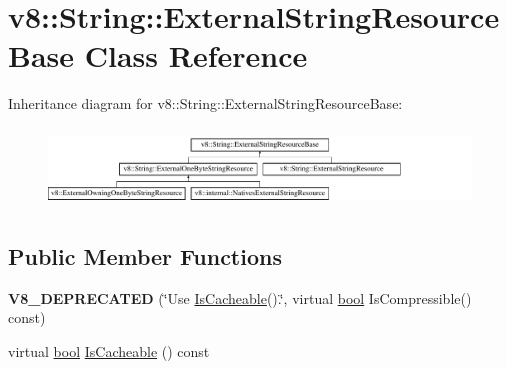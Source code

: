 \hypertarget{classv8_1_1String_1_1ExternalStringResourceBase}{}\section{v8\+:\+:String\+:\+:External\+String\+Resource\+Base Class Reference}
\label{classv8_1_1String_1_1ExternalStringResourceBase}
Inheritance diagram for v8\+:\+:String\+:\+:External\+String\+Resource\+Base\+:\begin{figure}[H]
\begin{center}
\leavevmode
\includegraphics[height=2.113208cm]{classv8_1_1String_1_1ExternalStringResourceBase}
\end{center}
\end{figure}
\subsection*{Public Member Functions}
\begin{DoxyCompactItemize}
\item 
\mbox{\label{classv8_1_1String_1_1ExternalStringResourceBase_a07d6b2291158845591c0458365582c31}} 
{\bfseries V8\+\_\+\+D\+E\+P\+R\+E\+C\+A\+T\+ED} (\char`\"{}Use \mbox{\hyperlink{classv8_1_1String_1_1ExternalStringResourceBase_a994c7580185c831abd45075d297dd07c}{Is\+Cacheable}}().\char`\"{}, virtual \mbox{\hyperlink{classbool}{bool}} Is\+Compressible() const)
\item 
virtual \mbox{\hyperlink{classbool}{bool}} \mbox{\hyperlink{classv8_1_1String_1_1ExternalStringResourceBase_a994c7580185c831abd45075d297dd07c}{Is\+Cacheable}} () const
\end{DoxyCompactItemize}
